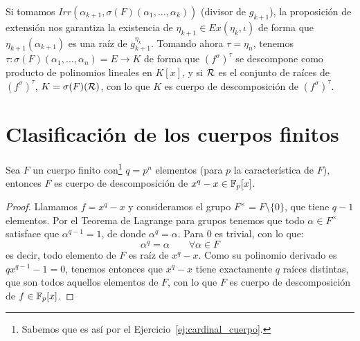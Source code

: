 \begin{ejercicio}
\begin{figure}[H]
    \end{figure}
    Si tomamos $Irr(\alpha_{k+1},\sigma(F)(\alpha_1, \ldots, \alpha_k))$ (divisor de $g_{k+1}$), la proposición de extensión nos garantiza la existencia de $\eta_{k+1}\in Ex(\eta_k,\iota)$ de forma que $\eta_{k+1}(\alpha_{k+1})$ es una raíz de $g_{k+1}^{\eta_k}$. Tomando ahora $\tau = \eta_{n}$, tenemos $\tau:\sigma(F)(\alpha_1, \ldots, \alpha_n) = E\to K$ de forma que ${(f^{\sigma})}^{\tau}$ se descompone como producto de polinomios lineales en $K[x]$, y si $\mathcal{R}$ es el conjunto de raíces de ${(f^{\sigma})}^{\tau}$, $K = \sigma(F)(\mathcal{R})$, con lo que $K$ es cuerpo de descomposición de ${(f^{\sigma})}^{\tau}$.
\end{ejercicio}

\section{Clasificación de los cuerpos finitos} 
\begin{prop}\label{prop:cuerpo_descomposicion}
    Sea $F$ un cuerpo finito con\footnote{Sabemos que es así por el Ejercicio~\ref{ej:cardinal_cuerpo}.} $q=p^n$ elementos (para $p$ la característica de $F$), entonces $F$ es cuerpo de descomposición de $x^q-x\in \mathbb{F}_p[x]$.
    \begin{proof}
        Llamamos $f=x^q-x$ y consideramos el grupo $F^{\times} = F\setminus\{0\}$, que tiene $q-1$ elementos. Por el Teorema de Lagrange para grupos tenemos que todo $\alpha\in F^{\times}$ satisface que $\alpha^{q-1}=1$, de donde $\alpha^q = \alpha$. Para $0$ es trivial, con lo que:
        \begin{equation*}
            \alpha^q = \alpha \qquad \forall \alpha\in F
        \end{equation*}
        es decir, todo elemento de $F$ es raíz de $x^q-x$. Como su polinomio derivado es $qx^{q-1}-1 = 0$, tenemos entonces que $x^q-x$ tiene exactamente $q$ raíces distintas, que son todos aquellos elementos de $F$, con lo que $F$ es cuerpo de descomposición de $f\in \mathbb{F}_p[x]$.
    \end{proof}
\end{prop}

